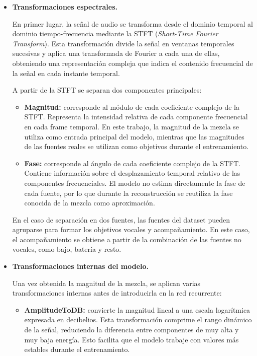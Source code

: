 \begin{itemize}

    \item \textbf{Transformaciones espectrales.}

    En primer lugar, la señal de audio se transforma desde el dominio temporal al dominio tiempo-frecuencia mediante la STFT (\textit{Short-Time Fourier Transform}). Esta transformación divide la señal en ventanas temporales sucesivas y aplica una transformada de Fourier a cada una de ellas, obteniendo una representación compleja que indica el contenido frecuencial de la señal en cada instante temporal.

    A partir de la STFT se separan dos componentes principales:

    \begin{itemize}
        \item \textbf{Magnitud:} corresponde al módulo de cada coeficiente complejo de la STFT. Representa la intensidad relativa de cada componente frecuencial en cada frame temporal. En este trabajo, la magnitud de la mezcla se utiliza como entrada principal del modelo, mientras que las magnitudes de las fuentes reales se utilizan como objetivos durante el entrenamiento.

        \item \textbf{Fase:} corresponde al ángulo de cada coeficiente complejo de la STFT. Contiene información sobre el desplazamiento temporal relativo de las componentes frecuenciales. El modelo no estima directamente la fase de cada fuente, por lo que durante la reconstrucción se reutiliza la fase conocida de la mezcla como aproximación.
    \end{itemize}

    En el caso de separación en dos fuentes, las fuentes del dataset pueden agruparse para formar los objetivos vocales y acompañamiento. En este caso, el acompañamiento se obtiene a partir de la combinación de las fuentes no vocales, como bajo, batería y resto.

    \item \textbf{Transformaciones internas del modelo.}

    Una vez obtenida la magnitud de la mezcla, se aplican varias transformaciones internas antes de introducirla en la red recurrente:

    \begin{itemize}
        \item \textbf{AmplitudeToDB:} convierte la magnitud lineal a una escala logarítmica expresada en decibelios. Esta transformación comprime el rango dinámico de la señal, reduciendo la diferencia entre componentes de muy alta y muy baja energía. Esto facilita que el modelo trabaje con valores más estables durante el entrenamiento.


\end{itemize}
\end{itemize}
